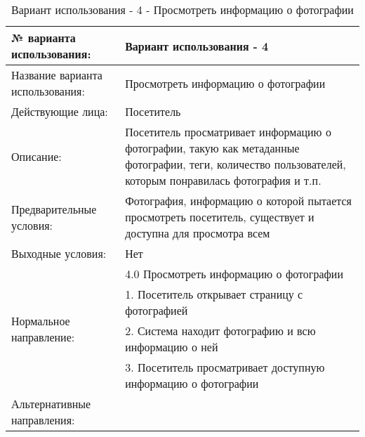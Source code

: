 \begin{table}[H]
  \caption{Вариант использования - 4 - Просмотреть информацию о фотографии}\label{use-case-4-table}
  \begin{tabular}{|p{6cm}|p{10cm}|}
  \hline № варианта использования: & Вариант использования - 4 \\
  \hline Название варианта использования: & Просмотреть информацию о фотографии \\
  \hline Действующие лица: & Посетитель \\
  \hline Описание: & Посетитель просматривает информацию о фотографии, такую как метаданные фотографии, теги, количество пользователей, которым понравилась фотография и т.п.  \\
  \hline Предварительные условия: & Фотография, информацию о которой пытается просмотреть посетитель, существует и доступна для просмотра всем \\
  \hline Выходные условия: & Нет \\
  \hline \multirow{4}{*}{Нормальное направление:} & 4.0 Просмотреть информацию о фотографии \\
  \cline{2-2} & 1. Посетитель открывает страницу с фотографией \\
  \cline{2-2} & 2. Система находит фотографию и всю информацию о ней \\
  \cline{2-2} & 3. Посетитель просматривает доступную информацию о фотографии \\
  \hline Альтернативные направления: &  \\
  \hline
  \end{tabular}
\end{table}

